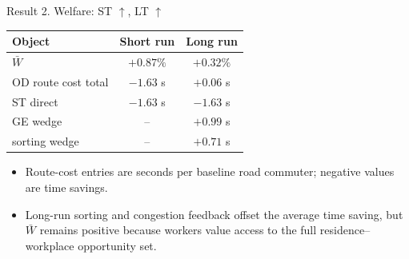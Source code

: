 \documentclass[11pt,aspectratio=169]{beamer}
\newcommand{\good}[1]{\textcolor{blue!70!black}{#1}}
\newcommand{\bad}[1]{\textcolor{red!70!black}{#1}}
\begin{document}
\begin{frame}[label=result2]{Result 2. Welfare: ST $\uparrow$, LT $\uparrow$}
\begin{center}\small
\begin{tabular}{lcc}
\toprule
Object & Short run & Long run \\
\midrule
$\bar W$ & \good{$+0.87\%$} & \good{$+0.32\%$} \\
OD route cost total & \good{$-1.63$ s} & \bad{$+0.06$ s} \\
\quad ST direct & \good{$-1.63$ s} & \good{$-1.63$ s} \\
\quad GE wedge & -- & \bad{$+0.99$ s} \\
\quad sorting wedge & -- & \bad{$+0.71$ s} \\
\bottomrule
\end{tabular}
\end{center}
\vspace{0.1em}

\vspace{0.25em}
\begin{itemize}\footnotesize
  \item Route-cost entries are seconds per baseline road commuter; negative values are time savings.
  \item Long-run sorting and congestion feedback offset the average time saving, but $\bar W$ remains positive because workers value access to the full residence--workplace opportunity set.
\end{itemize}
\end{frame}
\end{document}
